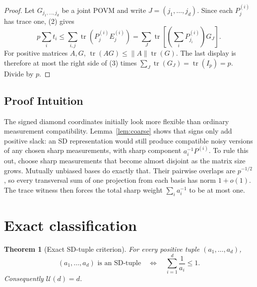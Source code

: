 \documentclass[11pt]{article}
\newtheorem{theorem}{Theorem}
\newcommand{\tr}{\operatorname{tr}}
\begin{document}
\begin{proof}
Let $G_{j_1,\ldots,j_d}$ be a joint POVM and write $J=(j_1,\ldots,j_d)$.
Since each $P^{(i)}_j$ has trace one, (2) gives
\[
 p\sum_i t_i
 \leq \sum_{i,j}\tr(P^{(i)}_jE^{(i)}_j)
 =\sum_J\tr\!\left[\left(\sum_iP^{(i)}_{j_i}\right)G_J\right].
\]
For positive matrices $A,G$, $\tr(AG)\leq\|A\|\tr(G)$.  The last display is
therefore at most the right side of (3) times
$\sum_J\tr(G_J)=\tr(I_p)=p$.  Divide by $p$.
\end{proof}

\subsection*{Proof Intuition}

The signed diamond coordinates initially look more flexible than ordinary
measurement compatibility.  Lemma~\ref{lem:coarse} shows that signs only add
positive slack: an SD representation would still produce compatible noisy
versions of any chosen sharp measurements, with sharp component
$a_i^{-1}P^{(i)}$.  To rule this out, choose sharp measurements that become
almost disjoint as the matrix size grows.  Mutually unbiased bases do exactly
that.  Their pairwise overlaps are $p^{-1/2}$, so every transversal sum of
one projection from each basis has norm $1+o(1)$.  The trace witness then
forces the total sharp weight $\sum_i a_i^{-1}$ to be at most one.

\section{Exact classification}

\begin{theorem}[Exact SD-tuple criterion]\label{thm:main}
For every positive tuple $(a_1,\ldots,a_d)$,
\begin{equation}
 (a_1,\ldots,a_d)\text{ is an SD-tuple}
 \quad\Longleftrightarrow\quad
 \sum_{i=1}^d\frac1{a_i}\leq1.
\end{equation}
Consequently $\mathcal U(d)=d$.
\end{theorem}
\end{document}
